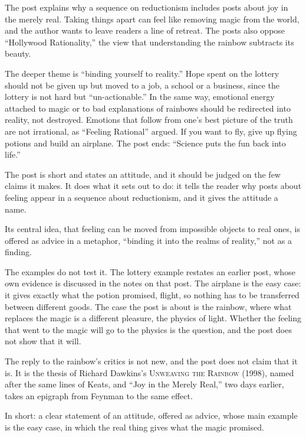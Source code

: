 \begin{afterword}
\summaryhead

The post explains why a sequence on reductionism includes posts about joy in the merely real. Taking things apart can feel like removing magic from the world, and the author wants to leave readers a line of retreat. The posts also oppose ``Hollywood Rationality,'' the view that understanding the rainbow subtracts its beauty.

The deeper theme is ``binding yourself to reality.'' Hope spent on the lottery should not be given up but moved to a job, a school or a business, since the lottery is not hard but ``un-actionable.'' In the same way, emotional energy attached to magic or to bad explanations of rainbows should be redirected into reality, not destroyed. Emotions that follow from one's best picture of the truth are not irrational, as ``Feeling Rational'' argued. If you want to fly, give up flying potions and build an airplane. The post ends: ``Science puts the fun back into life.''

\responsehead

The post is short and states an attitude, and it should be judged on the few claims it makes. It does what it sets out to do: it tells the reader why posts about feeling appear in a sequence about reductionism, and it gives the attitude a name.

Its central idea, that feeling can be moved from impossible objects to real ones, is offered as advice in a metaphor, ``binding it into the realms of reality,'' not as a finding.

The examples do not test it. The lottery example restates an earlier post, whose own evidence is discussed in the notes on that post. The airplane is the easy case: it gives exactly what the potion promised, flight, so nothing has to be transferred between different goods. The case the post is about is the rainbow, where what replaces the magic is a different pleasure, the physics of light. Whether the feeling that went to the magic will go to the physics is the question, and the post does not show that it will.

The reply to the rainbow's critics is not new, and the post does not claim that it is. It is the thesis of Richard Dawkins's \textsc{Unweaving the Rainbow} (1998), named after the same lines of Keats, and ``Joy in the Merely Real,'' two days earlier, takes an epigraph from Feynman to the same effect.

In short: a clear statement of an attitude, offered as advice, whose main example is the easy case, in which the real thing gives what the magic promised.
\end{afterword}
